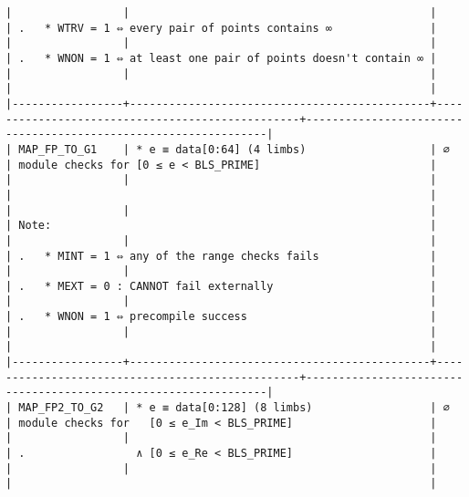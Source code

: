 \documentclass[varwidth=\maxdimen,margin=0.5cm,multi={verbatim}]{standalone}
\begin{document}
\begin{verbatim}
|                 |                                              |                                                 | .   * WTRV = 1 ⇔ every pair of points contains ∞               |
|                 |                                              |                                                 | .   * WNON = 1 ⇔ at least one pair of points doesn't contain ∞ |
|                 |                                              |                                                 |                                                                |
|-----------------+----------------------------------------------+-------------------------------------------------+----------------------------------------------------------------|
| MAP_FP_TO_G1    | * e ≡ data[0:64] (4 limbs)                   | ∅                                               | module checks for [0 ≤ e < BLS_PRIME]                          |
|                 |                                              |                                                 |                                                                |
|                 |                                              |                                                 | Note:                                                          |
|                 |                                              |                                                 | .   * MINT = 1 ⇔ any of the range checks fails                 |
|                 |                                              |                                                 | .   * MEXT = 0 : CANNOT fail externally                        |
|                 |                                              |                                                 | .   * WNON = 1 ⇔ precompile success                            |
|                 |                                              |                                                 |                                                                |
|-----------------+----------------------------------------------+-------------------------------------------------+----------------------------------------------------------------|
| MAP_FP2_TO_G2   | * e ≡ data[0:128] (8 limbs)                  | ∅                                               | module checks for   [0 ≤ e_Im < BLS_PRIME]                     |
|                 |                                              |                                                 | .                 ∧ [0 ≤ e_Re < BLS_PRIME]                     |
|                 |                                              |                                                 |                                                                |

\end{verbatim}
\end{document}
